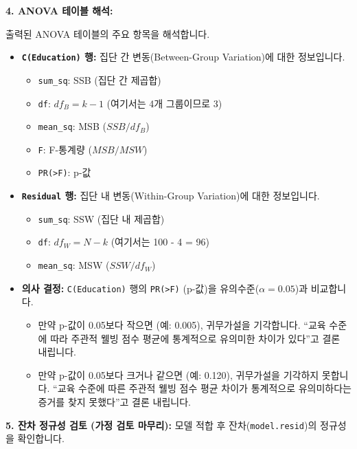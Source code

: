 \documentclass[
  letterpaper,
]{book}
\providecommand{\tightlist}{%
  \setlength{\itemsep}{0pt}\setlength{\parskip}{0pt}}
\begin{document}
\textbf{4. ANOVA 테이블 해석:}

출력된 ANOVA 테이블의 주요 항목을 해석합니다.

\begin{itemize}
\tightlist
\item
  \textbf{\texttt{C(Education)} 행:} 집단 간 변동(Between-Group
  Variation)에 대한 정보입니다.

  \begin{itemize}
  \tightlist
  \item
    \texttt{sum\_sq}: SSB (집단 간 제곱합)
  \item
    \texttt{df}: \(df_B = k - 1\) (여기서는 4개 그룹이므로 3)
  \item
    \texttt{mean\_sq}: MSB (\(SSB / df_B\))
  \item
    \texttt{F}: F-통계량 (\(MSB / MSW\))
  \item
    \texttt{PR(\textgreater{}F)}: p-값
  \end{itemize}
\item
  \textbf{\texttt{Residual} 행:} 집단 내 변동(Within-Group Variation)에
  대한 정보입니다.

  \begin{itemize}
  \tightlist
  \item
    \texttt{sum\_sq}: SSW (집단 내 제곱합)
  \item
    \texttt{df}: \(df_W = N - k\) (여기서는 100 - 4 = 96)
  \item
    \texttt{mean\_sq}: MSW (\(SSW / df_W\))
  \end{itemize}
\item
  \textbf{의사 결정:} \texttt{C(Education)} 행의
  \texttt{PR(\textgreater{}F)} (p-값)을 유의수준(\(\alpha=0.05\))과
  비교합니다.

  \begin{itemize}
  \tightlist
  \item
    만약 p-값이 0.05보다 작으면 (예: 0.005), 귀무가설을 기각합니다.
    ``교육 수준에 따라 주관적 웰빙 점수 평균에 통계적으로 유의미한
    차이가 있다''고 결론 내립니다.
  \item
    만약 p-값이 0.05보다 크거나 같으면 (예: 0.120), 귀무가설을 기각하지
    못합니다. ``교육 수준에 따른 주관적 웰빙 점수 평균 차이가 통계적으로
    유의미하다는 증거를 찾지 못했다''고 결론 내립니다.
  \end{itemize}
\end{itemize}

\textbf{5. 잔차 정규성 검토 (가정 검토 마무리):} 모델 적합 후
잔차(\texttt{model.resid})의 정규성을 확인합니다.
\end{document}
